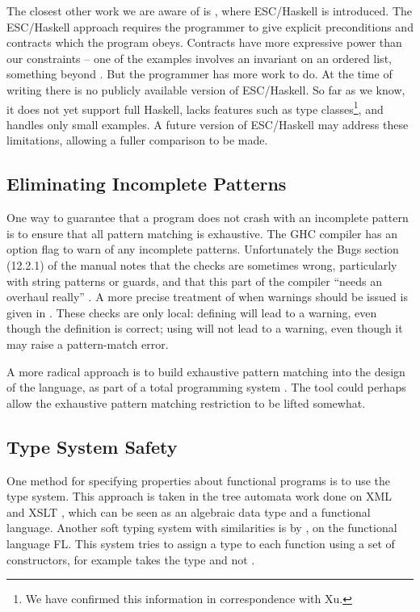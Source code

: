 The closest other work we are aware of is \citep{esc_haskell}, where ESC/Haskell is introduced. The ESC/Haskell approach requires the programmer to give explicit preconditions and contracts which the program obeys. Contracts have more expressive power than our constraints -- one of the examples involves an invariant on an ordered list, something beyond \catch{}. But the programmer has more work to do. At the time of writing there is no publicly available version of ESC/Haskell. So far as we know, it does not yet support full Haskell, lacks features such as type classes\footnote{We have confirmed this information in correspondence with Xu.}, and handles only small examples. A future version of ESC/Haskell may address these limitations, allowing a fuller comparison to be made.


\subsection{Eliminating Incomplete Patterns}

One way to guarantee that a program does not crash with an incomplete pattern is to ensure that all pattern matching is exhaustive. The GHC compiler \citep{ghc} has an option flag to warn of any incomplete patterns. Unfortunately the Bugs section (12.2.1) of the manual notes that the checks are sometimes wrong, particularly with string patterns or guards, and that this part of the compiler ``needs an overhaul really'' \citep{ghc}. A more precise treatment of when warnings should be issued is given in \citet{maranget:pattern_warnings}. These checks are only local: defining  will lead to a warning, even though the definition is correct; using  will not lead to a warning, even though it may raise a pattern-match error.

A more radical approach is to build exhaustive pattern matching into the design of the language, as part of a total programming system \citep{turner:total}. The \catch{} tool could perhaps allow the exhaustive pattern matching restriction to be lifted somewhat.


\subsection{Type System Safety}

One method for specifying properties about functional programs is to use the type system. This approach is taken in the tree automata work done on XML and XSLT \citep{static_xslt}, which can be seen as an algebraic data type and a functional language. Another soft typing system with similarities is by \citet{aiken:type_infer}, on the functional language FL. This system tries to assign a type to each function using a set of constructors, for example  takes the type  and not .

